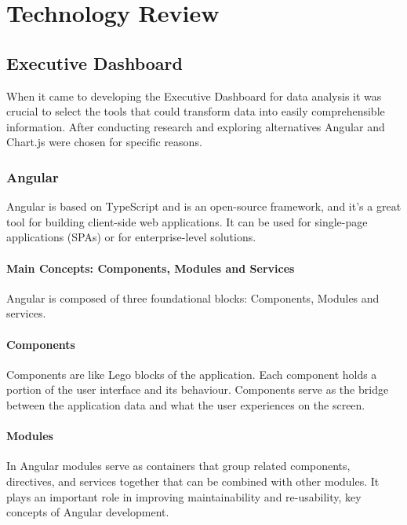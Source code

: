\setlength{\headheight}{15pt}
\addtolength{\topmargin}{-2.5pt}

\chapter{Technology Review}

\section{Executive Dashboard}
When it came to developing the Executive Dashboard for data analysis it was crucial to select the tools that could transform data into easily comprehensible information. After conducting research and exploring alternatives Angular and Chart.js were chosen for specific reasons.

\subsection{Angular}
Angular is based on TypeScript and is an open-source framework, and it's a great tool for building client-side web applications. It can be used for single-page applications (SPAs) or for enterprise-level solutions.

\subsubsection{Main Concepts: Components, Modules and Services}
Angular is composed of three foundational blocks: Components, Modules and services.

\subsubsection{Components} Components are like Lego blocks of the application. Each component holds a portion of the user interface and its behaviour. Components serve as the bridge between the application data and what the user experiences on the screen.\cite{angular-components}

\subsubsection{Modules} In Angular modules serve as containers that group related components, directives, and services together that can be combined with other modules. It plays an important role in improving maintainability and re-usability, key concepts of Angular development.\cite{angular-modules}


